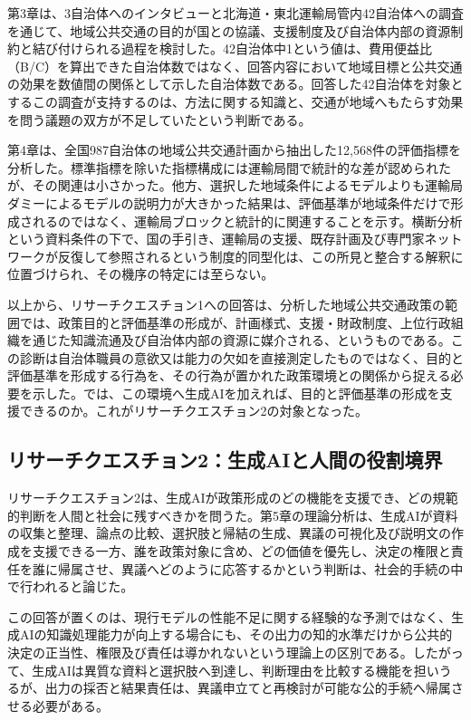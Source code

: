 第3章は、3自治体へのインタビューと北海道・東北運輸局管内42自治体への調査を通じて、地域公共交通の目的が国との協議、支援制度及び自治体内部の資源制約と結び付けられる過程を検討した。42自治体中1という値は、費用便益比（B/C）を算出できた自治体数ではなく、回答内容において地域目標と公共交通の効果を数値間の関係として示した自治体数である。回答した42自治体を対象とするこの調査が支持するのは、方法に関する知識と、交通が地域へもたらす効果を問う議題の双方が不足していたという判断である。

第4章は、全国987自治体の地域公共交通計画から抽出した12,568件の評価指標を分析した。標準指標を除いた指標構成には運輸局間で統計的な差が認められたが、その関連は小さかった。他方、選択した地域条件によるモデルよりも運輸局ダミーによるモデルの説明力が大きかった結果は、評価基準が地域条件だけで形成されるのではなく、運輸局ブロックと統計的に関連することを示す。横断分析という資料条件の下で、国の手引き、運輸局の支援、既存計画及び専門家ネットワークが反復して参照されるという制度的同型化は、この所見と整合する解釈に位置づけられ、その機序の特定には至らない。

以上から、リサーチクエスチョン1への回答は、分析した地域公共交通政策の範囲では、政策目的と評価基準の形成が、計画様式、支援・財政制度、上位行政組織を通じた知識流通及び自治体内部の資源に媒介される、というものである。この診断は自治体職員の意欲又は能力の欠如を直接測定したものではなく、目的と評価基準を形成する行為を、その行為が置かれた政策環境との関係から捉える必要を示した。では、この環境へ生成AIを加えれば、目的と評価基準の形成を支援できるのか。これがリサーチクエスチョン2の対象となった。

\subsection{リサーチクエスチョン2：生成AIと人間の役割境界}

リサーチクエスチョン2は、生成AIが政策形成のどの機能を支援でき、どの規範的判断を人間と社会に残すべきかを問うた。第5章の理論分析は、生成AIが資料の収集と整理、論点の比較、選択肢と帰結の生成、異議の可視化及び説明文の作成を支援できる一方、誰を政策対象に含め、どの価値を優先し、決定の権限と責任を誰に帰属させ、異議へどのように応答するかという判断は、社会的手続の中で行われると論じた。

この回答が置くのは、現行モデルの性能不足に関する経験的な予測ではなく、生成AIの知識処理能力が向上する場合にも、その出力の知的水準だけから公共的決定の正当性、権限及び責任は導かれないという理論上の区別である。したがって、生成AIは異質な資料と選択肢へ到達し、判断理由を比較する機能を担いうるが、出力の採否と結果責任は、異議申立てと再検討が可能な公的手続へ帰属させる必要がある。

